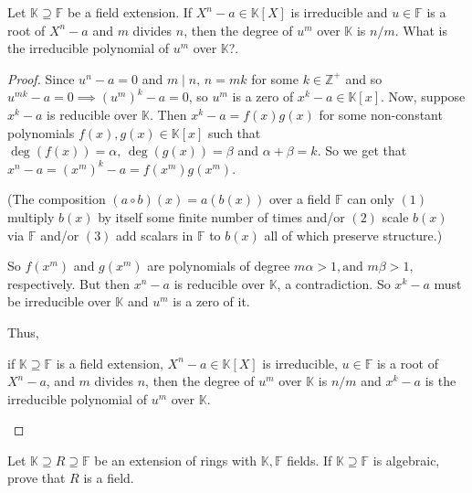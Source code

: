 \documentclass[addpoints,10pt]{exam}
\theoremstyle{plain}
\theoremstyle{definition}
\newtheorem{prob}[thm]{Problem}
\theoremstyle{plain}
\theoremstyle{plain}
\theoremstyle{definition}
\let\oldprob\prob
\let\endoldprob\endprob
\renewenvironment{prob}
  {\begin{singlespace}\oldprob}
  {\endoldprob\end{singlespace}}
\newcommand{\FF}{\ensuremath{\mathbb{F}}}
\newcommand{\KK}{\ensuremath{\mathbb{K}}}
\newcommand{\ZZ}{\ensuremath{\mathbb{Z}}}
\begin{document}
\begin{prob}
Let $\KK \supseteq \FF$ be a field extension. If $X^n - a \in \KK[X]$ is irreducible and $u \in \FF$ is a root of $X^n - a$ and $m$ divides $n$, then the degree of $u^m$ over $\KK$ is $n/m$. What is the irreducible polynomial of $u^m$ over $\KK$?.
\end{prob}
\begin{proof}
Since $u^{n}-a=0$ and $m\mid n,\, n=mk$ for some $k\in \ZZ^{+}$ and so $u^{mk}-a=0\implies (u^{m})^{k}-a=0$, so $u^{m}$ is a zero of $x^{k}-a\in \KK[x]$. Now, suppose $x^{k}-a$ is reducible over $\KK$. Then $x^{k}-a=f(x)g(x)$
for some non-constant polynomials $f(x),g(x)\in \KK[x]$ such that $\deg(f(x))=\alpha,\,\deg(g(x))=\beta$ and $\alpha+\beta=k$. So we get that $x^{n}-a=(x^{m})^{k}-a=f(x^{m})g(x^{m})$. 

(The composition $(a\circ b)(x)=a(b(x))$ over a field $\FF$ can only $(1)$ multiply $b(x)$ by itself some finite number of times and/or $(2)$ scale $b(x)$ via $\FF$ and/or $(3)$ add scalars in $\FF$ to $b(x)$ all of which preserve structure.)

So $f(x^{m})$ and $g(x^{m})$ are polynomials of degree $m\alpha>1,\text{and }m\beta>1,$ respectively. But then $x^{n}-a$ is reducible over $\KK$, a contradiction. So $x^{k}-a$ must be irreducible over $\KK$ and $u^{m}$ is a zero of it.

Thus,
\begin{center}
if $\KK \supseteq \FF$ is a field extension, $X^n - a \in \KK[X]$ is irreducible, $u \in \FF$ is a root of $X^n - a$, and $m$ divides $n$, then the degree of $u^m$ over $\KK$ is $n/m$ and $x^{k}-a$ is the irreducible polynomial of $u^{m}$ over $\KK$.
\end{center}
\end{proof}
\newpage
\begin{prob}
Let $\KK \supseteq R \supseteq \FF$ be an extension of rings with $\KK,\FF$ fields. If $\KK \supseteq \FF$ is algebraic, prove that $R$ is a field.
\end{prob}
\end{document}
